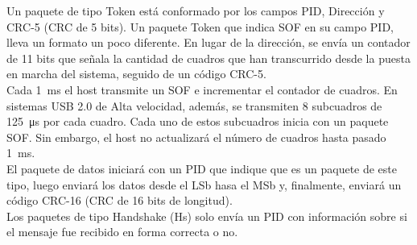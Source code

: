 	Un paquete de tipo Token está conformado por los campos PID, Dirección y CRC-5 (CRC de 5 bits). Un paquete Token que indica SOF en su campo PID, lleva un formato un poco diferente. En lugar de la dirección, se envía un contador de 11 bits que señala la cantidad de cuadros que han transcurrido desde la puesta en marcha del sistema, seguido de un código CRC-5.\\
		
	Cada \SI{1}{\milli\second} el host transmite un SOF e incrementar el contador de cuadros. En sistemas USB 2.0 de Alta velocidad, además, se transmiten 8 subcuadros de \SI{125}{\micro\second} por cada cuadro. Cada uno de estos subcuadros inicia con un paquete SOF. Sin embargo, el host no actualizará el número de cuadros hasta pasado \SI{1}{\milli\second}.\\
		
	El paquete de datos iniciará con un PID que indique que es un paquete de este tipo, luego enviará los datos desde el LSb hasa el MSb y, finalmente, enviará un código CRC-16 (CRC de 16 bits de longitud).\\
		
	Los paquetes de tipo Handshake (Hs) solo envía un PID con información sobre si el mensaje fue recibido en forma correcta o no.\\